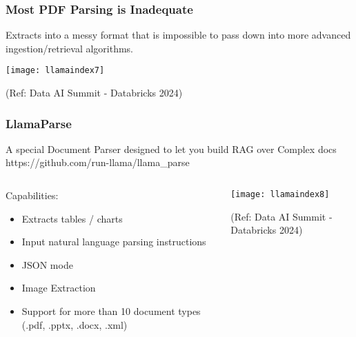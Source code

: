 \begin{frame}[fragile]\frametitle{Most PDF Parsing is Inadequate}
Extracts into a messy format that is impossible to pass down into more advanced ingestion/retrieval algorithms.


\begin{center}
\texttt{[image: llamaindex7]}

{\tiny (Ref: Data AI Summit - Databricks 2024)}
\end{center}
\end{frame}

\begin{frame}[fragile]\frametitle{LlamaParse}
A special Document Parser designed to let you build RAG over Complex docs
https://github.com/run-llama/llama\_parse


\begin{columns}
    \begin{column}[T]{0.4\linewidth}
Capabilities:
		\begin{itemize}
		\item Extracts tables / charts
		\item Input natural language parsing instructions
		\item JSON mode
		\item Image Extraction
		\item Support for more than 10 document types (.pdf, .pptx, .docx, .xml)

		\end{itemize}	
		
    \end{column}
    \begin{column}[T]{0.6\linewidth}
		\begin{center}
		\texttt{[image: llamaindex8]}

		{\tiny (Ref: Data AI Summit - Databricks 2024)}
		\end{center}
    \end{column}
  \end{columns}
  
\end{frame}

